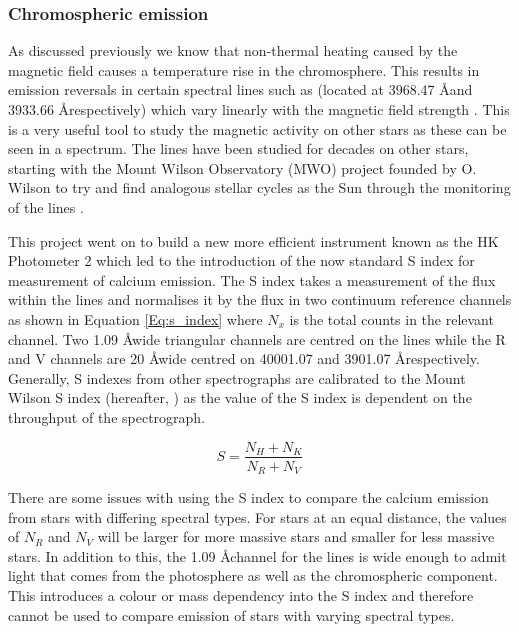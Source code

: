 \subsubsection{Chromospheric emission}
\label{chromospheric_emission_subsub}
As discussed previously we know that non-thermal heating caused by the magnetic field causes a temperature rise in the chromosphere. This results in emission reversals in certain spectral lines such as \caII (located at 3968.47 \AA \space and 3933.66 \AA \space respectively) which vary linearly with the magnetic field strength \citep{Frazier_1970}. This is a very useful tool to study the magnetic activity on other stars as these can be seen in a spectrum. The \caII lines have been studied for decades on other stars, starting with the Mount Wilson Observatory (MWO) project founded by O. Wilson to try and find analogous stellar cycles as the Sun through the monitoring of the \caII lines \citep{Wilson_1968}.

This project went on to build a new more efficient instrument known as the HK Photometer 2 \citep{Vaughan_etal_1978} which led to the introduction of the now standard S index for measurement of calcium emission. The S index takes a measurement of the flux within the \caII lines and normalises it by the flux in two continuum reference channels as shown in Equation \ref{Eq:s_index} where $N_{x}$ is the total counts in the relevant channel. Two 1.09 \AA \space wide triangular channels are centred on the \caII lines while the R and V channels are 20 \AA \space wide centred on 40001.07 and 3901.07 \AA respectively. Generally, S indexes from other spectrographs are calibrated to the Mount Wilson S index (hereafter, \Smw) as the value of the S index is dependent on the throughput of the spectrograph.

\begin{equation}
    S = \frac{N_{H} + N_{K}}{N_{R} + N_{V}}
    \label{Eq:s_index}
\end{equation}

There are some issues with using the S index to compare the calcium emission from stars with differing spectral types. For stars at an equal distance, the values of $N_{R}$ and $N_{V}$ will be larger for more massive stars and smaller for less massive stars. In addition to this, the 1.09 \AA \space channel for the \caII lines is wide enough to admit light that comes from the photosphere as well as the chromospheric component. This introduces a colour or mass dependency into the S index and therefore cannot be used to compare emission of stars with varying spectral types.

